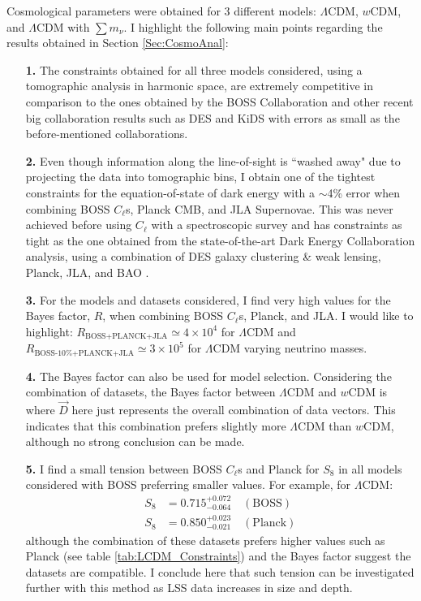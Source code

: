 \qquad Cosmological parameters were obtained for 3 different models: $\Lambda$CDM, $w$CDM, and $\Lambda$CDM with $\sum m_{\nu}$. I highlight the following main points regarding the results obtained in Section \ref{Sec:CosmoAnal}:
\begin{itemize}
\item[\textbf{1.}] The constraints obtained for all three models considered, using a tomographic analysis in harmonic space, are extremely competitive in comparison to the ones obtained by the BOSS Collaboration \citep{2016BOSSCosmology} and other recent big collaboration results such as DES \citep{2017arXiv170801530D} and KiDS \citep{2017MNRAS.465.1454H} with errors as small as the before-mentioned collaborations.

\item[\textbf{2.}] Even though information along the line-of-sight is ``washed away" due to projecting the data into tomographic bins, I obtain one of the tightest constraints for the  equation-of-state of dark energy with a $\sim$4\% error when combining BOSS $C_{\ell}$s, Planck CMB, and JLA Supernovae. This was never achieved before using $C_{\ell}$ with a spectroscopic survey and has constraints as tight as the one obtained from the state-of-the-art Dark Energy Collaboration analysis, using a combination of DES galaxy clustering \& weak lensing, Planck, JLA, and BAO \citep{2017arXiv170801530D}.

\item[\textbf{3.}] For the models and datasets considered, I find very high values for the Bayes factor, $R$, when combining BOSS $C_{\ell}$s, Planck, and JLA. I would like to highlight: $R_{\scriptscriptstyle\text{BOSS+PLANCK+JLA}} \simeq 4 \times 10^4$ for $\Lambda$CDM and $R_{\scriptscriptstyle\text{BOSS-10\%+PLANCK+JLA}} \simeq 3 \times 10^5$ for $\Lambda$CDM varying neutrino masses. 

\item[\textbf{4.}] The Bayes factor can also be used for model selection. Considering the combination of datasets, the Bayes factor between $\Lambda$CDM and $w$CDM is
where $\vec{D}$ here just represents the overall combination of data vectors. This indicates that this combination prefers slightly more $\Lambda$CDM than $w$CDM, although no strong conclusion can be made. 

\item[\textbf{5.}] I find a small tension between BOSS $C_{\ell}$s and Planck for $S_8$ in all models considered with BOSS preferring smaller values. For example, for $\Lambda$CDM: 
\begin{align*}
S_8 & = 0.715^{+0.072}_{-0.064} \quad(\text{BOSS}) \\ \nonumber
S_8 &  = 0.850^{+0.023}_{-0.021}\quad(\text{Planck}) \nonumber
\end{align*}
although the combination of these datasets prefers higher values such as Planck (see table \ref{tab:LCDM_Constraints}) and the Bayes factor suggest the datasets are compatible. I conclude here that such tension can be investigated further with this method as LSS data increases in size and depth.


\end{itemize}
